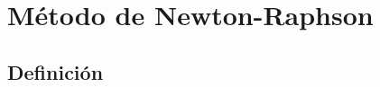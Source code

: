 \documentclass[12pt]{beamer}
\begin{document}



\section{Método de Newton-Raphson}
\subsection{Definición}
\end{document}
